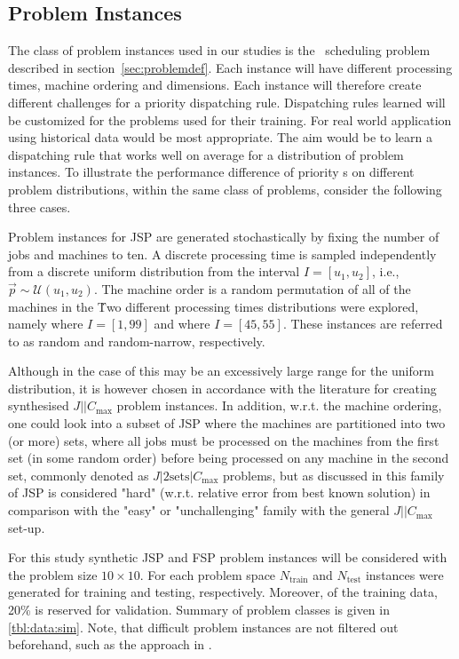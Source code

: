 \documentclass[smallextended]{svjour3}
\begin{document}
\subsection*{Problem Instances}\label{sec:data:sim}

The class of problem instances used in our studies is the \jsp\ scheduling 
problem described in section~\ref{sec:problemdef}. Each instance will have 
different processing times, machine ordering and dimensions. Each instance will 
therefore create different challenges for a priority dispatching rule. 
Dispatching rules learned will be customized for the problems used for their 
training. For real world application using historical data would be most 
appropriate. The aim would be to learn a dispatching rule that works well on 
average for a distribution of problem instances. To illustrate the performance 
difference of priority \dr s on different problem distributions, 
within the same class of problems, consider the following three cases.

Problem instances for JSP are generated stochastically by fixing the number of 
jobs and machines to ten. A discrete processing time is sampled independently from a 
discrete uniform distribution from the interval $I=[u_1,u_2]$, i.e., 
$\vec{p}\sim \mathcal{U}(u_1,u_2)$. 
The machine order is a random permutation of all of the machines in the 
\jsp\. Two different processing times distributions were explored, namely 
where $I=[1,99]$ and  where $I=[45,55]$. These instances 
are referred to as random and random-narrow, respectively. 

Although in the case of   this may be an excessively large range for 
the uniform distribution, it is however chosen in accordance with the 
literature \cite{Demirkol98} for creating synthesised $J||C_{\max}$ problem 
instances. In addition, w.r.t. the machine ordering, one could look into a 
subset of JSP where the machines are partitioned into two (or more) sets, where 
all jobs must be processed on the machines from the first set (in some random 
order) before being processed on any machine in the second set, commonly 
denoted as $J|2\textrm{sets}|C_{\max}$ problems, but as discussed in 
\cite{orlib_swv} this family of JSP is considered "hard" (w.r.t. relative error 
from best known solution) in comparison with the "easy" or "unchallenging" 
family with the general $J||C_{\max}$ set-up. %


For this study synthetic JSP and FSP problem instances will be considered with 
the problem size $10\times10$. 
For each problem space $N_{\text{train}}$  and $N_{\text{test}}$ instances were 
generated for training and testing, respectively. Moreover, of the training 
data, 20\% is reserved for validation.
Summary of problem classes is given in \cref{tbl:data:sim}.  
Note, that difficult problem instances are not filtered out beforehand, such as 
the approach in \cite{Whitley}. 
\end{document}
